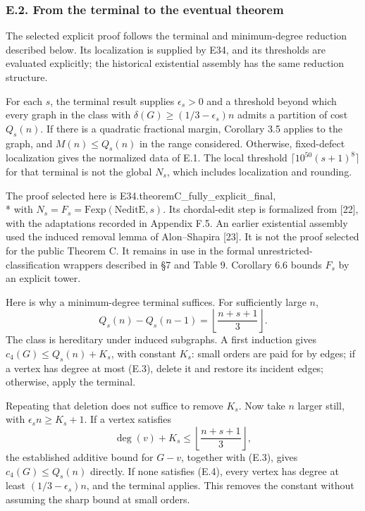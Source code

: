 \documentclass[english,11pt,a4paper]{article}
\newcounter{none}
\begin{document}
\subsubsection{E.2. From the terminal to the eventual theorem}\label{e.2.-from-the-terminal-to-the-eventual-theorem}

The selected explicit proof follows the terminal and minimum-degree reduction described below. Its localization is supplied by E34, and its thresholds are evaluated explicitly; the historical existential assembly has the same reduction structure.

For each \(s\), the terminal result supplies \(\epsilon_s>0\) and a threshold beyond which every graph in the class with \(\delta(G)\ge(1/3-\epsilon_s)n\) admits a partition of cost \(Q_s(n)\). If there is a quadratic fractional margin, Corollary 3.5 applies to the graph, and \(M(n)\le Q_s(n)\) in the range considered. Otherwise, fixed-defect localization gives the normalized data of E.1. The local threshold \(\lceil10^{50}(s+1)^8\rceil\) for that terminal is not the global \(N_s\), which includes localization and rounding.

The proof selected here is {\ttfamily\small E34.\discretionary{\hbox{\ensuremath{\hookrightarrow}}}{}{}theoremC\_\discretionary{\hbox{\ensuremath{\hookrightarrow}}}{}{}fully\_\discretionary{\hbox{\ensuremath{\hookrightarrow}}}{}{}explicit\_\discretionary{\hbox{\ensuremath{\hookrightarrow}}}{}{}final},\\* with \(N_s=F_s=\mathrm{Fexp}(\mathrm{NeditE},s)\). Its chordal-edit step is formalized from {[}22{]}, with the adaptations recorded in Appendix F.5. An earlier existential assembly used the induced removal lemma of Alon--Shapira {[}23{]}. It is not the proof selected for the public Theorem C. It remains in use in the formal unrestricted-classification wrappers described in §7 and Table 9. Corollary 6.6 bounds \(F_s\) by an explicit tower.

Here is why a minimum-degree terminal suffices. For sufficiently large \(n\), \[
Q_s(n)-Q_s(n-1)=\left\lfloor\frac{n+s+1}{3}\right\rfloor.
\tag{E.3}
\] The class is hereditary under induced subgraphs. A first induction gives \(c_4(G)\le Q_s(n)+K_s\), with constant \(K_s\): small orders are paid for by edges; if a vertex has degree at most (E.3), delete it and restore its incident edges; otherwise, apply the terminal.

Repeating that deletion does not suffice to remove \(K_s\). Now take \(n\) larger still, with \(\epsilon_s n\ge K_s+1\). If a vertex satisfies \[
\deg(v)+K_s\le\left\lfloor\frac{n+s+1}{3}\right\rfloor,
\tag{E.4}
\] the established additive bound for \(G-v\), together with (E.3), gives \(c_4(G)\le Q_s(n)\) directly. If none satisfies (E.4), every vertex has degree at least \((1/3-\epsilon_s)n\), and the terminal applies. This removes the constant without assuming the sharp bound at small orders.
\end{document}
